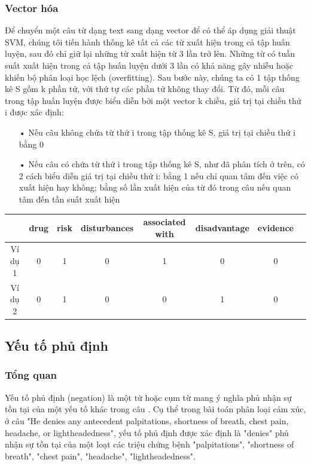 \subsubsection*{Vector hóa}
Để chuyển một câu từ dạng text sang dạng vector để có thể áp dụng giải thuật SVM, chúng tôi tiến hành thống kê tất cả các từ xuất hiện trong cả tập huấn luyện, sau đó chỉ giữ lại những từ xuất hiện từ 3 lần trở lên. Những từ có tuần suất xuất hiện trong cả tập huấn luyện dưới 3 lần có khả năng gây nhiễu hoặc khiến bộ phân loại học lệch (overfitting). Sau bước này, chúng ta có 1 tập thống kê S gồm k phần tử, với thứ tự các phần tử không thay đổi. Từ đó, mỗi câu trong tập huấn luyện được biểu diễn bởi một vector k chiều, giá trị tại chiều thứ i được xác định:
\begin{itemize}[noitemsep]
\item[•] Nếu câu không chứa từ thứ i trong tập thống kê S, giá trị tại chiều thứ i bằng 0
\item[•] Nếu câu có chứa từ thứ i trong tập thống kê S, như đã phân tích ở trên, có 2 cách biểu diễn giá trị tại chiều thứ i: bằng 1 nếu chỉ quan tâm đến việc có xuất hiện hay không; bằng số lần xuất hiện của từ đó trong câu nếu quan tâm đến tần suất xuất hiện
\end{itemize}

\begin{tabular}{| c | c | c | c | c | c | c | c |}
\hline
  & \textbf{drug} & \textbf{risk} & \textbf{disturbances} & \textbf{associated with} & \textbf{disadvantage} & \textbf{evidence}
\\ \hline
Ví dụ 1 & 0 & 1 & 0 & 1 & 0 & 0
\\ \hline
Ví dụ 2 & 0 & 1 & 0 & 0 & 1 & 0
\\ \hline
\end{tabular}

\subsection{Yếu tố phủ định}
\subsubsection*{Tổng quan}
Yếu tố phủ định (negation) là một từ hoặc cụm từ mang ý nghĩa phủ nhận sự tồn tại của một yếu tố khác trong câu \cite{skeppstedt2016marker}. Cụ thể trong bài toán phân loại cảm xúc, ở câu "He denies any antecedent palpitations, shortness of breath, chest pain, headache, or lightheadedness", yếu tố phủ định được xác định là "denies" phủ nhận sự tồn tại của một loạt các triệu chứng bệnh "palpitations", "shortness of breath", "chest pain", "headache", "lightheadedness".  \\

